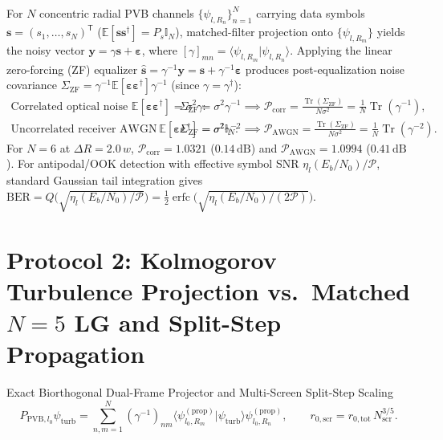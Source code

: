 \documentclass[10pt,letterpaper]{article}
\newcommand{\braket}[2]{\langle #1 | #2 \rangle}
\numberwithin{equation}{section}
\begin{document}
For $N$ concentric radial PVB channels $\{\psi_{l,R_n}\}_{n=1}^N$ carrying data symbols $\mathbf{s} = (s_1,\dots,s_N)^{\mathsf{T}}$ ($\mathbb{E}[\mathbf{s}\mathbf{s}^\dagger] = P_s\mathbb{I}_N$), matched-filter projection onto $\{\psi_{l,R_m}\}$ yields the noisy vector $\mathbf{y} = \gamma\mathbf{s} + \boldsymbol{\varepsilon}$, where $[\gamma]_{mn} = \braket{\psi_{l,R_m}}{\psi_{l,R_n}}$. Applying the linear zero-forcing (ZF) equalizer $\hat{\mathbf{s}} = \gamma^{-1}\mathbf{y} = \mathbf{s} + \gamma^{-1}\boldsymbol{\varepsilon}$ produces post-equalization noise covariance $\Sigma_{\mathrm{ZF}} = \gamma^{-1}\mathbb{E}[\boldsymbol{\varepsilon}\boldsymbol{\varepsilon}^\dagger]\gamma^{-1}$ (since $\gamma = \gamma^\dagger$):
\begin{align}
  \text{Correlated optical noise }\mathbb{E}[\boldsymbol{\varepsilon}\boldsymbol{\varepsilon}^\dagger] = \sigma^2\gamma: &\quad \Sigma_{\mathrm{ZF}} = \sigma^2\gamma^{-1} \implies \mathcal{P}_{\mathrm{corr}} = \frac{\operatorname{Tr}(\Sigma_{\mathrm{ZF}})}{N\sigma^2} = \frac{1}{N}\operatorname{Tr}(\gamma^{-1}), \\
  \text{Uncorrelated receiver AWGN }\mathbb{E}[\boldsymbol{\varepsilon}\boldsymbol{\varepsilon}^\dagger] = \sigma^2\mathbb{I}_N: &\quad \Sigma_{\mathrm{ZF}} = \sigma^2\gamma^{-2} \implies \mathcal{P}_{\mathrm{AWGN}} = \frac{\operatorname{Tr}(\Sigma_{\mathrm{ZF}})}{N\sigma^2} = \frac{1}{N}\operatorname{Tr}(\gamma^{-2}).
\end{align}
For $N=6$ at $\Delta R = 2.0\,w$, $\mathcal{P}_{\mathrm{corr}} = 1.0321$ ($0.14\,\mathrm{dB}$) and $\mathcal{P}_{\mathrm{AWGN}} = 1.0994$ ($0.41\,\mathrm{dB}$). For antipodal/OOK detection with effective symbol SNR $\eta_l (E_b/N_0)/\mathcal{P}$, standard Gaussian tail integration gives $\mathrm{BER} = Q\!\bigl(\sqrt{\eta_l(E_b/N_0)/\mathcal{P}}\bigr) = \frac{1}{2}\operatorname{erfc}\!\bigl(\sqrt{\eta_l(E_b/N_0)/(2\mathcal{P})}\bigr)$.

\section{Protocol 2: Kolmogorov Turbulence Projection vs.\ Matched $N=5$ LG and Split-Step Propagation}
\label{sec:p2_turb}

\begin{targeteq}{Exact Biorthogonal Dual-Frame Projector and Multi-Screen Split-Step Scaling}
\[
  P_{\mathrm{PVB},l_0}\psi_{\mathrm{turb}} = \sum_{n,m=1}^N (\gamma^{-1})_{nm}\braket{\psi_{l_0,R_m}^{(\mathrm{prop})}}{\psi_{\mathrm{turb}}}\psi_{l_0,R_n}^{(\mathrm{prop})}, \qquad r_{0,\mathrm{scr}} = r_{0,\mathrm{tot}}\,N_{\mathrm{scr}}^{3/5}.
\]
\end{targeteq}
\end{document}
